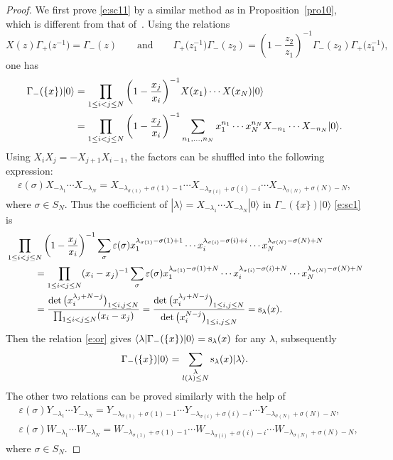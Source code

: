 \documentclass[pdftex]{sigma}
\numberwithin{equation}{section}
\begin{document}
\begin{proof}
We first prove \eqref{e:sc11} by a similar method as in Proposition~\ref{pro10}, which is different from that of~\cite{JL2020}.
Using the relations
\[
X(z)\Gamma_+\big(z^{-1}\big)=\Gamma_-(z) \qquad \text{and}\qquad \Gamma_+\big(z^{-1}_1\big)\Gamma_-(z_2)=\left(1-\frac{z_2}{z_1}\right)^{-1}\Gamma_-(z_2)\Gamma_+\big(z^{-1}_1\big),
\]
one has
\begin{align}
\Gamma_-(\{x\})|0\rangle&{}=\prod_{1\leq i<j\leq N}\bigg(1-\frac{x_j}{x_i}\bigg)^{-1}X(x_1)\cdots X(x_N)|0\rangle\notag\\
&{}=\prod_{1\leq i<j\leq N}\bigg(1-\frac{x_j}{x_i}\bigg)^{-1}\sum_{n_1,\dots,n_N}x^{n_1}_1\cdots x^{n_N}_NX_{-n_1}\cdots X_{-n_N}|0\rangle.\label{e:sc1}
\end{align}
 Using $X_iX_j=-X_{j+1}X_{i-1}$, the factors can be shuffled into the following expression:
\begin{align}\label{e:sc15}
\varepsilon(\sigma)X_{-\lambda_1}\cdots X_{-\lambda_N}=X_{-\lambda_{\sigma(1)}+\sigma(1)-1}\cdots X_{-\lambda_{\sigma(i)}+\sigma(i)-i}\cdots X_{-\lambda_{\sigma(N)}+\sigma(N)-N},
\end{align}
where $\sigma\in S_N$. Thus the coefficient of $|\lambda\rangle=X_{-\lambda_1}\cdots X_{-\lambda_N}|0\rangle$ in $\Gamma_-(\{x\})|0\rangle$ \eqref{e:sc1} is
\begin{align*}
&\prod_{1\leq i<j\leq N}\bigg(1-\frac{x_j}{x_i}\bigg)^{-1}\sum_{\sigma}\varepsilon(\sigma)x^{\lambda_{\sigma(1)}-\sigma(1)+1}_1\cdots x^{\lambda_{\sigma(i)}-\sigma(i)+i}_i\cdots x^{\lambda_{\sigma(N)}-\sigma(N)+N}_N\\
&\qquad\quad{}=\prod_{1\leq i<j\leq N} (x_i-x_j)^{-1}\sum_{\sigma}\varepsilon(\sigma)x^{\lambda_{\sigma(1)}-\sigma(1)+N}_1\cdots x^{\lambda_{\sigma(i)}-\sigma(i)+N}_i\cdots x^{\lambda_{\sigma(N)}-\sigma(N)+N}_N\\
&\qquad\quad{}=\frac{\det\big(x^{\lambda_j+N-j}_i\big)_{1\leq i,j\leq N}}{\prod_{1\leq i<j\leq N} (x_i-x_j)}
 = \frac{\det\big(x^{\lambda_j+N-j}_i\big)_{1\leq i,j\leq N}}{\det\big(x^{N-j}_i\big)_{1\leq i,j\leq N}} = {\rm s}_\lambda(x).
\end{align*}
Then the relation \eqref{e:or} gives $\langle\lambda|\Gamma_-(\{x\})|0\rangle={\rm s}_\lambda(x)$ for any $\lambda$, subsequently
\begin{align*}
\Gamma_-(\{x\})|0\rangle=\sum_{\substack{\lambda\\l(\lambda)\leq N}}{\rm s}_\lambda(x)|\lambda\rangle.
\end{align*}
The other two relations can be proved similarly with the help of
\begin{align}
&\varepsilon(\sigma)Y_{-\lambda_1}\cdots Y_{-\lambda_N}=Y_{-\lambda_{\sigma(1)}+\sigma(1)-1}\cdots Y_{-\lambda_{\sigma(i)}+\sigma(i)-i}\cdots Y_{-\lambda_{\sigma(N)}+\sigma(N)-N},\nonumber\\
&\varepsilon(\sigma)W_{-\lambda_1}\cdots W_{-\lambda_N}=W_{-\lambda_{\sigma(1)}+\sigma(1)-1}\cdots W_{-\lambda_{\sigma(i)}+\sigma(i)-i}\cdots W_{-\lambda_{\sigma(N)}+\sigma(N)-N},\label{e:sp1}
\end{align}
where $\sigma\in S_N$.
\end{proof}
\end{document}
